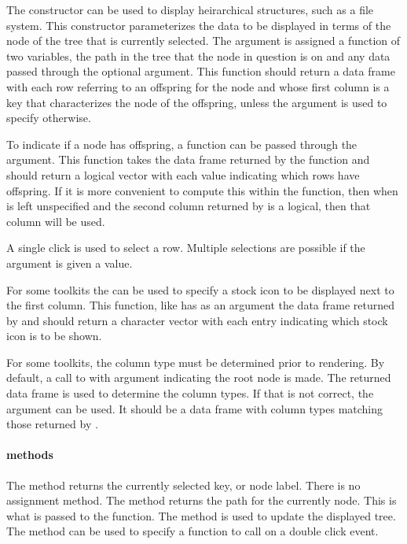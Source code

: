 The  constructor can be used to display
heirarchical structures, such as a file system. This constructor
parameterizes the data to be displayed in terms of the node of the
tree that is currently selected. The 
argument is assigned a function of two variables, the path in the tree
that the node in question is on and any data passed through the
optional  argument. This function
should return a data frame with each row referring to an offspring for
the node and whose first column is a key that characterizes the node
of the offspring, unless the argument  is
used to specify otherwise.

To indicate if a node has offspring, a function can be passed through
the  argument. This function takes the
data frame returned by the  function and should return
a logical vector with each value indicating which rows have
offspring. If it is more convenient to compute this within the
 function, then when  is left
unspecified and the second column returned by  is a
logical, then that column will be used.

A single click is used to select a row. Multiple selections are
possible if the  argument is given a
 value.

For some toolkits the  can be used to
specify a stock icon to be displayed next to the first column. This
function, like  has as an argument the data frame
returned by  and should return a character vector with
each entry indicating which stock icon is to be shown.

For some toolkits, the column type must be determined prior to
rendering. By default, a call to  with argument
 indicating the root node is made. The returned data frame
is used to determine the column types. If that is not correct, the
argument  can be used. It should be a data
frame with column types matching those returned by .

\paragraph{methods}
The  method returns the currently selected key,
or node label. There is no assignment method. The \method{[}{gtree}
method returns the path for the currently node. This is what is passed
to the  function.  The  method
is used to update the displayed tree.  The method
 can be used to specify a
function to call on a double click event.

